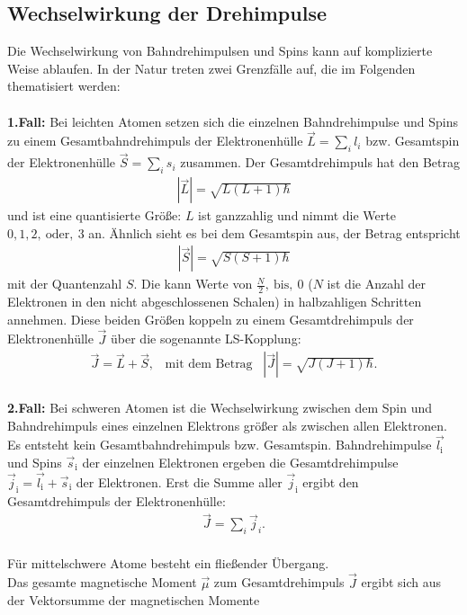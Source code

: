 \subsection{Wechselwirkung der Drehimpulse}
Die Wechselwirkung von Bahndrehimpulsen und Spins kann auf komplizierte Weise ablaufen.
In der Natur treten zwei Grenzfälle auf, die im Folgenden thematisiert werden:\\
\\
\textbf{1.Fall:} Bei leichten Atomen setzen sich die einzelnen Bahndrehimpulse und Spins
zu einem Gesamtbahndrehimpuls der Elektronenhülle $\vec{L}=\sum_i l_i$
bzw. Gesamtspin der Elektronenhülle $\vec{S}=\sum_i s_i$ zusammen.
Der Gesamtdrehimpuls hat den Betrag
\begin{align*}
 |\vec{L}|=\sqrt{L(L+1)\hbar}
\end{align*}
und ist eine quantisierte Größe:
$L$ ist ganzzahlig und nimmt die Werte $0,1,2 ,\ \text{oder} ,\ 3$ an.
Ähnlich sieht es bei dem Gesamtspin aus, der Betrag entspricht
\begin{align*}
 |\vec{S}|=\sqrt{S(S+1)\hbar}
\end{align*}
mit der Quantenzahl $S$. Die kann Werte von $\frac{N}{2} ,\ \text{bis} ,\ 0$
($N$ ist die Anzahl der Elektronen in den nicht abgeschlossenen Schalen)
in halbzahligen Schritten annehmen.
Diese beiden Größen koppeln zu einem Gesamtdrehimpuls der Elektronenhülle $\vec{J}$ über die sogenannte LS-Kopplung:
\begin{align}
  \vec{J}=\vec{L}+\vec{S} ,\,\,\,\,\, \text{mit dem Betrag}\,\,\,\,\,|\vec{J}|=\sqrt{J(J+1)\hbar}.
\end{align}\\
\textbf{2.Fall:} Bei schweren Atomen ist die Wechselwirkung zwischen dem Spin und
Bahndrehimpuls eines einzelnen Elektrons größer als zwischen allen Elektronen.
Es entsteht kein Gesamtbahndrehimpuls bzw. Gesamtspin.
Bahndrehimpulse $\vec{\textit{l}_\mathrm{i}}$ und Spins $\vec{s}_\mathrm{i}$ der einzelnen Elektronen ergeben
die Gesamtdrehimpulse $\vec{j}_\mathrm{i}=\vec{\textit{l}_\mathrm{i}}+\vec{s}_\mathrm{i}$ der Elektronen.
Erst die Summe aller $\vec{j}_\mathrm{i}$ ergibt den Gesamtdrehimpuls der Elektronenhülle:
\begin{align}
\vec{J}=\sum_i \vec{j}_i.
\end{align}\\
Für mittelschwere Atome besteht ein fließender Übergang.
\\
Das gesamte magnetische Moment $\vec{\mu}$ zum Gesamtdrehimpuls $\vec{J}$ ergibt sich aus der Vektorsumme der magnetischen Momente
